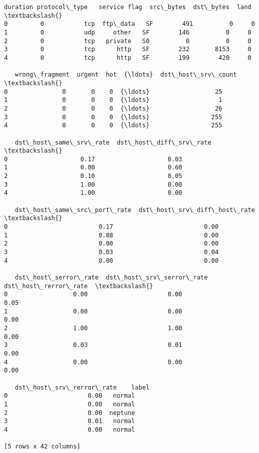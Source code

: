\documentclass[11pt]{article}
\makeatletter
\newcommand{\boxspacing}{\kern\kvtcb@left@rule\kern\kvtcb@boxsep}
\newcommand{\prompt}[4]{
        {\ttfamily\llap{{\color{#2}[#3]:\hspace{3pt}#4}}\vspace{-\baselineskip}}
    }
\makeatother
\begin{document}
            \begin{tcolorbox}[breakable, size=fbox, boxrule=.5pt, pad at break*=1mm, opacityfill=0]
\prompt{Out}{outcolor}{3}{\boxspacing}
\begin{Verbatim}[commandchars=\\\{\}]
   duration protocol\_type   service flag  src\_bytes  dst\_bytes  land  \textbackslash{}
0         0           tcp  ftp\_data   SF        491          0     0
1         0           udp     other   SF        146          0     0
2         0           tcp   private   S0          0          0     0
3         0           tcp      http   SF        232       8153     0
4         0           tcp      http   SF        199        420     0

   wrong\_fragment  urgent  hot  {\ldots}  dst\_host\_srv\_count  \textbackslash{}
0               0       0    0  {\ldots}                  25
1               0       0    0  {\ldots}                   1
2               0       0    0  {\ldots}                  26
3               0       0    0  {\ldots}                 255
4               0       0    0  {\ldots}                 255

   dst\_host\_same\_srv\_rate  dst\_host\_diff\_srv\_rate  \textbackslash{}
0                    0.17                    0.03
1                    0.00                    0.60
2                    0.10                    0.05
3                    1.00                    0.00
4                    1.00                    0.00

   dst\_host\_same\_src\_port\_rate  dst\_host\_srv\_diff\_host\_rate  \textbackslash{}
0                         0.17                         0.00
1                         0.88                         0.00
2                         0.00                         0.00
3                         0.03                         0.04
4                         0.00                         0.00

   dst\_host\_serror\_rate  dst\_host\_srv\_serror\_rate  dst\_host\_rerror\_rate  \textbackslash{}
0                  0.00                      0.00                  0.05
1                  0.00                      0.00                  0.00
2                  1.00                      1.00                  0.00
3                  0.03                      0.01                  0.00
4                  0.00                      0.00                  0.00

   dst\_host\_srv\_rerror\_rate    label
0                      0.00   normal
1                      0.00   normal
2                      0.00  neptune
3                      0.01   normal
4                      0.00   normal

[5 rows x 42 columns]
\end{Verbatim}
\end{tcolorbox}
        
\end{document}
